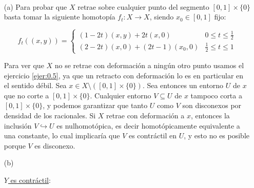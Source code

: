 \documentclass[twoside]{article}
\begin{document}
\begin{solucion}\
\begin{enumerate}
\item[(a)] Para probar que $X$ retrae sobre cualquier punto del segmento $[0,1]\times\{0\}$ basta tomar la siguiente homotopía $f_t:X\to X$, siendo $x_0\in [0,1]$ fijo:

\[
f_t((x,y))=\begin{cases}
(1-2t)(x,y)+2t(x,0) & 0\leq t\leq \frac{1}{2}\\
(2-2t)(x,0)+(2t-1)(x_0,0) & \frac{1}{2}\leq t\leq 1
\end{cases}
\]

Para ver que $X$ no se retrae con deformación a ningún otro punto usamos el ejercicio \ref{ejer:0.5}, ya que un retracto con deformación lo es en particular en el sentido débil. Sea $x\in X\setminus([0,1]\times\{0\})$. Sea entonces un entorno $U$ de $x$ que no corte a $[0,1]\times\{0\}$. Cualquier entorno $V\subseteq U$ de $x$ tampoco corta a $[0,1]\times\{0\}$, y podemos garantizar que tanto $U$ como $V$ son disconexos por densidad de los racionales. Si $X$ retrae con deformación a $x$, entonces la inclusión $V\hookrightarrow U$ es nulhomotópica, es decir homotópicamente equivalente a una constante, lo cual implicaría que $V$ es contráctil en $U$, y esto no es posible porque $V$ es disconexo. 

\item[(b)] 

\underline{$Y$ es contráctil}:



\end{enumerate}
\end{solucion}
\end{document}
